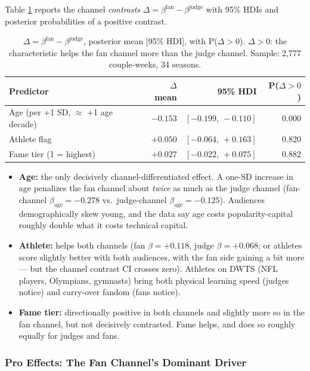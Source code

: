 \documentclass{article}
\begin{document}
Table \ref{tab:m3-delta} reports the channel \emph{contrasts} $\Delta = \beta^{\text{fan}} - \beta^{\text{judge}}$ with 95\% HDIs and posterior probabilities of a positive contrast.

\begin{table}[H]
\centering
\caption{$\Delta = \beta^{\text{fan}} - \beta^{\text{judge}}$, posterior mean [95\% HDI], with P($\Delta > 0$). $\Delta > 0$: the characteristic helps the fan channel more than the judge channel. Sample: 2{,}777 couple-weeks, 34 seasons.}
\label{tab:m3-delta}
\begin{tabular}{lrrr}
\toprule
Predictor & $\Delta$ mean & 95\% HDI & P($\Delta > 0$) \\
\midrule
Age (per +1 SD, $\approx$ +1 age decade) & $\mathbf{-0.153}$ & $[-0.199,\ -0.110]$ & 0.000 \\
Athlete flag & $+0.050$ & $[-0.064,\ +0.163]$ & 0.820 \\
Fame tier (1 = highest) & $+0.027$ & $[-0.022,\ +0.075]$ & 0.882 \\
\bottomrule
\end{tabular}
\end{table}

\begin{itemize}
  \item \textbf{Age:} the only decisively channel-differentiated effect. A one-SD increase in age penalizes the fan channel about \emph{twice} as much as the judge channel (fan-channel $\beta_{\text{age}} = -0.278$ vs.\ judge-channel $\beta_{\text{age}} = -0.125$). Audiences demographically skew young, and the data say age costs popularity-capital roughly double what it costs technical capital.
  \item \textbf{Athlete:} helps both channels (fan $\beta = +0.118$, judge $\beta = +0.068$; or athletes score slightly better with both audiences, with the fan side gaining a bit more --- but the channel contrast CI crosses zero). Athletes on DWTS (NFL players, Olympians, gymnasts) bring both physical learning speed (judges notice) and carry-over fandom (fans notice).
  \item \textbf{Fame tier:} directionally positive in both channels and slightly more so in the fan channel, but not decisively contrasted. Fame helps, and does so roughly equally for judges and fans.
\end{itemize}

\subsubsection{Pro Effects: The Fan Channel's Dominant Driver}
\end{document}
